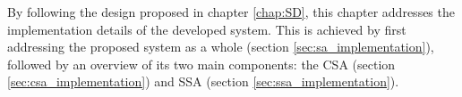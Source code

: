 By following the design proposed in chapter \ref{chap:SD}, this chapter addresses the implementation details of the developed system. This is achieved by first addressing the proposed system as a whole (section \ref{sec:sa_implementation}), followed by an overview of its two main components: the CSA (section \ref{sec:csa_implementation}) and SSA (section \ref{sec:ssa_implementation}). 
